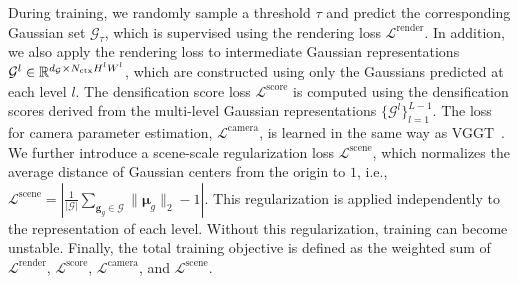 During training, we randomly sample a threshold $\tau$ and predict the corresponding Gaussian set $\mathcal{G}_\tau$, which is supervised using the rendering loss $\mathcal{L}^{\text{render}}$. In addition, we also apply the rendering loss to intermediate Gaussian representations $\mathcal{G}^l\in\mathbb{R}^{d_\mathcal{G}\times N_{\text{ctx}} H^l W^l}$, which are constructed using only the Gaussians predicted at each level $l$.
The densification score loss $\mathcal{L}^{\text{score}}$ is computed using the densification scores derived from the multi-level Gaussian representations $\{\mathcal{G}^l\}_{l=1}^{L-1}$. The loss for camera parameter estimation, $\mathcal{L}^{\text{camera}}$, is learned in the same way as VGGT~\cite{wang2025vggt}.
We further introduce a scene-scale regularization loss $\mathcal{L}^{\text{scene}}$, which normalizes the average distance of Gaussian centers from the origin to $1$, i.e., $\mathcal{L}^{\text{scene}} = \left|\frac{1}{|\mathcal{G}|}\sum_{\mathbf{g}_g\in\mathcal{G}} \|\boldsymbol{\mu}_g\|_2 - 1\right|$. This regularization is applied independently to the representation of each level. Without this regularization, training can become unstable. Finally, the total training objective is defined as the weighted sum of $\mathcal{L}^\text{render}$, $\mathcal{L}^\text{score}$, $\mathcal{L}^\text{camera}$, and $\mathcal{L}^\text{scene}$.
